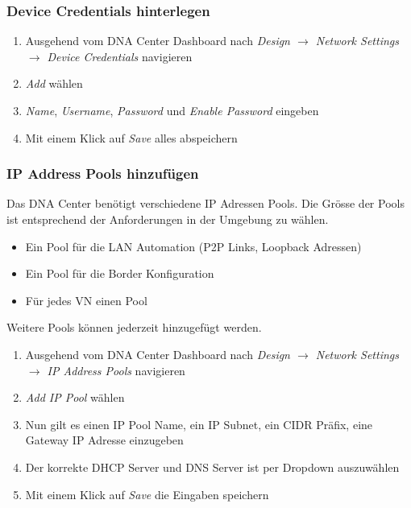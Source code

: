 \subsubsection{Device Credentials hinterlegen}
\begin{enumerate}
	\item Ausgehend vom DNA Center Dashboard nach \textit{Design $\rightarrow$ Network Settings $\rightarrow$ Device Credentials} navigieren
	\item \textit{Add} wählen
	\item \textit{Name}, \textit{Username}, \textit{Password} und \textit{Enable Password} eingeben
	\item Mit einem Klick auf \textit{Save} alles abspeichern
\end{enumerate}

\subsubsection{IP Address Pools hinzufügen}
Das DNA Center benötigt verschiedene IP Adressen Pools. Die Grösse der Pools ist entsprechend der Anforderungen in der Umgebung zu wählen.
\begin{itemize}
	\item Ein Pool für die LAN Automation (P2P Links, Loopback Adressen)
	\item Ein Pool für die Border Konfiguration
	\item Für jedes VN einen Pool
\end{itemize}

Weitere Pools können jederzeit hinzugefügt werden.

\begin{enumerate}
	\item Ausgehend vom DNA Center Dashboard nach \textit{Design $\rightarrow$ Network Settings $\rightarrow$ IP Address Pools} navigieren
	\item \textit{Add IP Pool} wählen
	\item Nun gilt es einen IP Pool Name, ein IP Subnet, ein CIDR Präfix, eine Gateway IP Adresse einzugeben
	\item Der korrekte DHCP Server und DNS Server ist per Dropdown auszuwählen
	\item Mit einem Klick auf \textit{Save} die Eingaben speichern
\end{enumerate}

